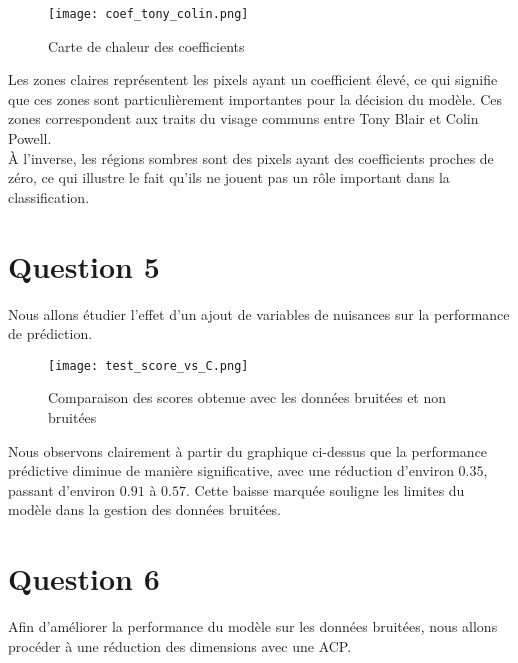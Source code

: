 \documentclass{article}
\begin{document}
\begin{figure}[H]
    \centering
    \texttt{[image: coef\_tony\_colin.png]}
    \caption{Carte de chaleur des coefficients}
    \label{fig:enter-label}
\end{figure}

Les zones claires représentent les pixels ayant un coefficient élevé, ce qui signifie que ces zones sont particulièrement importantes pour la décision du modèle. Ces zones correspondent aux traits du visage communs entre Tony Blair et Colin Powell. \\

À l'inverse, les régions sombres sont des pixels ayant des coefficients proches de zéro, ce qui illustre le fait qu'ils ne jouent pas un rôle important dans la classification.



\section{Question 5}


Nous allons étudier l'effet d'un ajout de variables de nuisances sur la performance de prédiction.




\begin{figure}[H]
    \centering
    \texttt{[image: test\_score\_vs\_C.png]}
    \caption{Comparaison des scores obtenue avec les données bruitées et non bruitées}
    \label{fig:enter-label}
\end{figure}

Nous observons clairement à partir du graphique ci-dessus que la performance prédictive diminue de manière significative, avec une réduction d'environ $0.35$, passant d'environ $0.91$ à $0.57$. Cette baisse marquée souligne les limites du modèle dans la gestion des données bruitées.



\section{Question 6}


Afin d'améliorer la performance du modèle sur les données bruitées, nous allons procéder à une réduction des dimensions avec une ACP.
\end{document}

